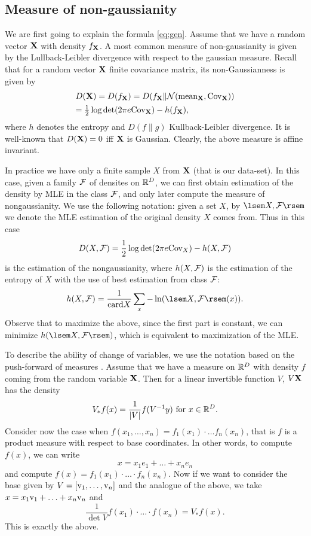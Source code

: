 \subsection{Measure of non-gaussianity}

We are first going to explain the formula \eqref{eq:gen}.
Assume that we have a random vector $\mathbf{X}$ with density $f_{\mathbf{X}}$. A most common
measure of non-gaussianity is given by the Lullback-Leibler divergence with respect to 
the gaussian measure.
Recall that for a random vector $\mathbf{X}$ finite covariance matrix, its non-Gaussianness is given by
$$
\begin{array}{l}
D(\mathbf{X})=D(f_{\mathbf{X}})=D(f_{\mathbf{X}} \| \mathcal{N}(\mathrm{mean}_{\mathbf{X}},\mathrm{Cov}_{\mathbf{X}}))\\[1ex]
=\frac{1}{2}\log \det(2\pi e \mathrm{Cov}_{\mathbf{X}})-h(f_{\mathbf{X}}),
\end{array}
$$
where $h$ denotes the entropy and $D(f\|g)$ Kullback-Leibler divergence.
It is well-known \cite{cover2012elements} that $D(\mathbf{X})=0$ iff $\mathbf{X}$ is Gaussian.
Clearly, the above measure is affine invariant.

In practice we have only a finite sample $X$ from $\mathbf{X}$ (that is our data-set). In this case, given a 
family $\mathcal{F}$ of densites on $\mathbb{R}^D$, we can first obtain estimation of the density
by MLE in the class $\mathcal{F}$, and only later compute the measure of nongaussianity. We use the following
notation: given a set $X$, by $\de{X,\F}$ we denote the MLE estimation of the original density $X$ comes from. Thus in this case 
$$
D(X,\mathcal{F})=\frac{1}{2}\log \det(2\pi e \mathrm{Cov}_X)-h(X,\mathcal{F})
$$ 
is the estimation of the nongaussianity, where $h(X,\mathcal{F})$ is the estimation of the entropy of $X$
with the use of best estimation from class $\mathcal{F}$: 
$$
h(X,\F)=\frac{1}{\card X}\sum_x -\ln (\de{X,\F}(x)).
$$
Observe that to maximize the above, since the first part is constant, we can minimize
$h(\de{X,\F})$, which is equivalent to maximization of the MLE.

To describe the ability of change of variables, we use the notation based on the push-forward of measures
%
\cite{bogachev2007measure}. Assume that we have a measure on $\mathbb{R}^D$ with density $f$ coming from the random variable $\mathbf{X}$. Then for a linear invertible function $V$, $V\mathbf{X}$ has the density 
$$
V_*f(x)=\frac{1}{|V|} f(V^{-1}y) \text{ for } x \in \mathbb{R}^D.
$$
Consider now the case when $f(x_1,\ldots,x_n)=f_1(x_1)\cdot \ldots f_n(x_n)$, that is $f$
is a product measure with respect to base coordinates. In other words, to compute $f(x)$, we can
write
$$
x=x_1 e_1+\ldots +x_n e_n
$$
and compute $f(x)=f_1(x_1) \cdot \ldots \cdot f_n(x_n)$. Now if we want to consider the base given by $V=[\mathrm{v}_1,\ldots,\mathrm{v}_n]$ and the analogue of the above,
we take $x=x_1 \mathrm{v}_1 +\ldots +x_n \mathrm{v}_n$ and 
$$
\frac{1}{\det V} f(x_1) \cdot \ldots \cdot  f(x_n)=V_*f(x).
$$
This is exactly the above.


